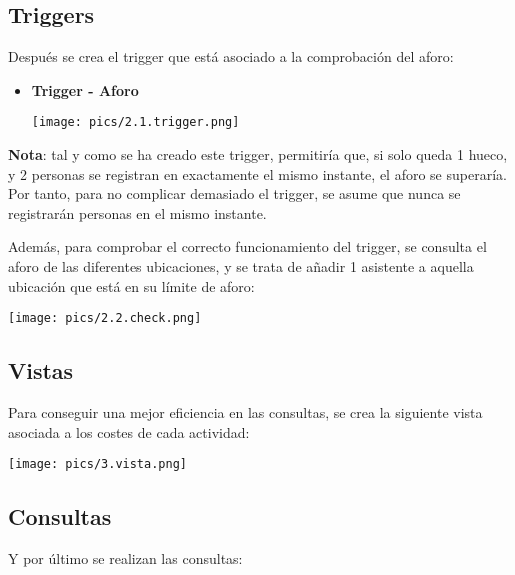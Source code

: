 \documentclass[12pt]{article}
\begin{document}
    \subsection{Triggers}    
    Después se crea el trigger que está asociado a la comprobación del aforo:

    \begin{itemize}
        \item \textbf{Trigger - Aforo}
        \begin{center}{\texttt{[image: pics/2.1.trigger.png]}}\end{center}
    \end{itemize}

    \textbf{Nota}: tal y como se ha creado este trigger, permitiría que, si solo queda 1 hueco, y 2 personas se registran en exactamente el mismo instante, el aforo 
    se superaría. Por tanto, para no complicar demasiado el trigger, se asume que nunca se registrarán personas en el mismo instante. 

    Además, para comprobar el correcto funcionamiento del trigger, se consulta el aforo de las diferentes ubicaciones, y se trata de añadir 1 asistente 
    a aquella ubicación que está en su límite de aforo:
    
    \begin{center}{\texttt{[image: pics/2.2.check.png]}}\end{center}

    \subsection{Vistas}  
    Para conseguir una mejor eficiencia en las consultas, se crea la siguiente vista asociada a los costes de cada actividad:
    
    \begin{center}{\texttt{[image: pics/3.vista.png]}}\end{center}
    
    \subsection{Consultas}  
    Y por último se realizan las consultas:
\end{document}
